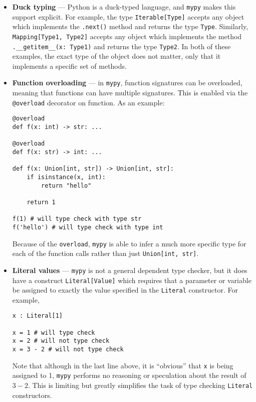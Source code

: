 \documentclass{report}
\begin{document}
\begin{itemize}
    \item \textbf{Duck typing} --- Python is a duck-typed language, and \texttt{mypy} makes this support explicit. For example, the type \texttt{Iterable[Type]} accepts any object which implements the \texttt{.next()} method and returns the type \texttt{Type}. Similarly, \texttt{Mapping[Type1, Type2]} accepts any object which implements the method \texttt{.__getitem__(x: Type1)} and returns the type \texttt{Type2}. In both of these examples, the exact type of the object does not matter, only that it implements a specific set of methods.

    \item \textbf{Function overloading} --- in \texttt{mypy}, function signatures can be overloaded, meaning that functions can have multiple signatures. This is enabled via the \texttt{@overload} decorator on function. As an example:

    \begin{singlespace*}
    \begin{verbatim}
@overload
def f(x: int) -> str: ...

@overload
def f(x: str) -> int: ...

def f(x: Union[int, str]) -> Union[int, str]:
    if isinstance(x, int):
        return "hello"

    return 1

f(1) # will type check with type str
f('hello') # will type check with type int\end{verbatim}
    \end{singlespace*}
    Because of the \texttt{overload}, \texttt{mypy} is able to infer a much more specific type for each of the function calls rather than just \texttt{Union[int, str]}.

    \item \textbf{Literal values} --- \texttt{mypy} is not a general dependent type checker, but it does have a construct \texttt{Literal[Value]} which requires that a parameter or variable be assigned to exactly the value specified in the \texttt{Literal} constructor. For example,

    \begin{singlespace*}
        \begin{verbatim}
x : Literal[1]

x = 1 # will type check
x = 2 # will not type check
x = 3 - 2 # will not type check\end{verbatim}
    \end{singlespace*}
    Note that although in the last line above, it is ``obvious'' that \texttt{x} is being assigned to 1, \texttt{mypy} performs no reasoning or speculation about the result of $3 - 2$. This is limiting but greatly simplifies the task of type checking \texttt{Literal} constructors.

\end{itemize}
\end{document}
